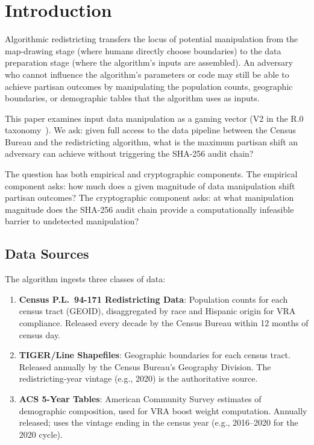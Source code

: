 \section{Introduction}
\label{sec:introduction}

Algorithmic redistricting transfers the locus of potential manipulation
from the map-drawing stage (where humans directly choose boundaries) to
the data preparation stage (where the algorithm's inputs are assembled).
An adversary who cannot influence the algorithm's parameters or code
may still be able to achieve partisan outcomes by manipulating the
population counts, geographic boundaries, or demographic tables that
the algorithm uses as inputs.

This paper examines input data manipulation as a gaming vector (V2 in
the R.0 taxonomy~\citep{r0paper}).
We ask: given full access to the data pipeline between the Census Bureau
and the redistricting algorithm, what is the maximum partisan shift an
adversary can achieve without triggering the SHA-256 audit chain?

The question has both empirical and cryptographic components.
The empirical component asks: how much does a given magnitude of data
manipulation shift partisan outcomes?
The cryptographic component asks: at what manipulation magnitude does the
SHA-256 audit chain provide a computationally infeasible barrier to
undetected manipulation?

\subsection{Data Sources}

The \bisect{} algorithm ingests three classes of data:

\begin{enumerate}
\item \textbf{Census P.L.\ 94-171 Redistricting Data}: Population counts
  for each census tract (GEOID), disaggregated by race and Hispanic origin
  for VRA compliance.
  Released every decade by the Census Bureau within 12 months of census day.
\item \textbf{TIGER/Line Shapefiles}: Geographic boundaries for each
  census tract.
  Released annually by the Census Bureau's Geography Division.
  The redistricting-year vintage (e.g., 2020) is the authoritative source.
\item \textbf{ACS 5-Year Tables}: American Community Survey estimates
  of demographic composition, used for VRA boost weight computation.
  Annually released; \bisect{} uses the vintage ending in the census year
  (e.g., 2016--2020 for the 2020 cycle).
\end{enumerate}

